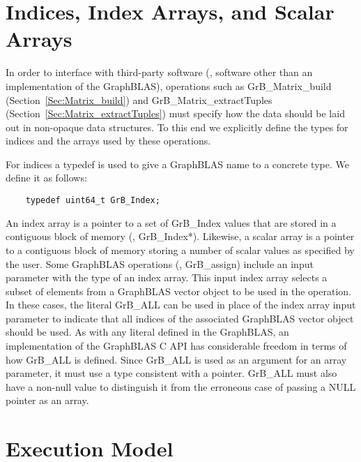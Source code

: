 
\section{Indices, Index Arrays, and Scalar Arrays}

In order to interface with third-party software (\ie, software other than
an implementation of the GraphBLAS), operations 
such as {\sf GrB\_Matrix\_build} (Section~\ref{Sec:Matrix_build}) and
{\sf GrB\_Matrix\_extractTuples} (Section~\ref{Sec:Matrix_extractTuples}) must specify
how the data should be laid out in  non-opaque data structures.  To 
this end we explicitly define the types for indices and the arrays 
used by these operations.

For indices a {\sf typedef} is used to give a GraphBLAS name to a concrete type. We define it as follows:

\begin{verbatim}
    typedef uint64_t GrB_Index;
\end{verbatim}

An index array is a pointer to a set of {\sf GrB\_Index} values that are 
stored in a contiguous block of memory (\ie, {\sf GrB\_Index*}).
Likewise, a scalar array is a pointer to a contiguous block of memory 
storing a number of scalar values as specified by the user.
Some GraphBLAS operations (\eg, {\sf GrB\_assign})  include an input parameter with the type of an index array. 
This input index array selects a subset of elements from a GraphBLAS vector object to be used in the operation.
In these cases, the literal {\sf GrB\_ALL} 
can be used in place of the index array input parameter to indicate that all indices 
of the associated GraphBLAS vector object should be used.
As with any literal defined in the GraphBLAS, an implementation of the GraphBLAS C API has considerable 
freedom in terms of how {\sf GrB\_ALL} is defined.  Since {\sf GrB\_ALL} is used as an argument for an array 
parameter, it must use a type consistent with a pointer. {\sf GrB\_ALL} must also have a non-null
value to distinguish it from the erroneous case of passing a {\sf NULL} pointer as an array.

\section{Execution Model}
\label{Sec:ExecutionModel}

